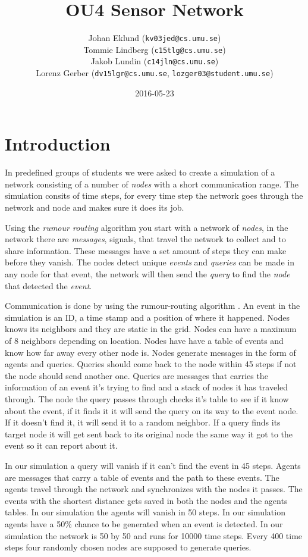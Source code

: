 \documentclass[a4paper,11pt,twoside]{article}
\title{OU4 Sensor Network}
\author{Johan Eklund ({\tt{kv03jed@cs.umu.se}}) \\ 
Tommie Lindberg ({\tt{c15tlg@cs.umu.se}}) \\
Jakob Lundin ({\tt{c14jln@cs.umu.se}}) \\
Lorenz Gerber ({\tt{dv15lgr@cs.umu.se}}, {\tt{lozger03@student.umu.se}})
}
\date{2016-05-23}
\begin{document}
\lstset{language=C}
\maketitle
\thispagestyle{empty}
\newpage
\tableofcontents
\thispagestyle{empty}
\newpage

\clearpage
{}

\section{Introduction}
In predefined groups of students we were asked to create a simulation
of a network consisting of a number of \textit{nodes} with a short
communication range. The simulation consits of time steps, for every
time step the network goes through the network and node and makes sure
it does its job.

Using the \textit{rumour routing} algorithm \cite{braginsky2002} you
start with a network of \textit{nodes}, in the  network there are
\textit{messages}, signals, that travel the network to
collect and to share information. These messages have a set amount of
steps they can make before they vanish. The nodes detect unique
\textit{events} and \textit{queries} can be made in any node for that
event, the network will then send the \textit{query} to find the
\textit{node} that detected the \textit{event}.

Communication is done by using the rumour-routing algorithm
\cite{braginsky2002}. An event in the simulation is an ID, a time
stamp and a  position of where it happened. Nodes knows its neighbors
and they are static in the grid. Nodes can have a maximum of 8
neighbors depending on location. Nodes have have a table of events and
know how far away every other node is. Nodes generate messages in the
form of agents and queries. Queries should come back to the node
within 45 steps if not the node should send another one. Queries are
messages that carries the information of an event it's trying to find
and a stack of nodes it has traveled through. The node the query
passes through checks it's table to see if it know about the event, if
it finds it it will send the query on its way to the event node. If it
doesn't find it, it will send it to a random neighbor. If a query
finds its target node it will get sent back to its original node the
same way it got to the event so it can report about it.

In our simulation a query will vanish if it can't find the event in 45
steps. Agents are messages that carry a table of events and the path
to these events. The agents travel through the network and
synchronizes with the nodes it passes. The events with the shortest
distance gets saved in both the nodes and the agents tables. In our
simulation the agents will vanish in 50 steps. In our simulation
agents have a 50\% chance to be generated when an event is
detected. In our simulation the network is 50 by 50 and runs for
10000 time steps. Every 400 time steps four randomly chosen nodes are
supposed to generate queries.
\end{document}
